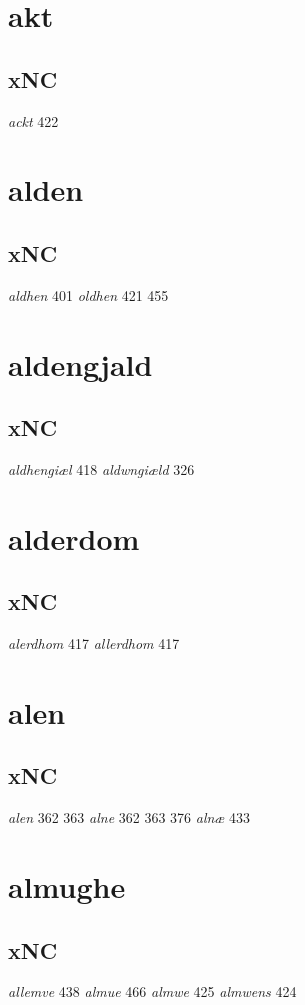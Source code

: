 \documentclass[a4paper,twocolumn]{article}
\begin{document}
\section{akt}
\label{sec:orga728b2c}
\subsection{xNC}
\label{sec:orgcb6cc9c}
\emph{ackt} 422 
\section{alden}
\label{sec:org356114f}
\subsection{xNC}
\label{sec:org428e76a}
\emph{aldhen} 401 \emph{oldhen} 421 455 
\section{aldengjald}
\label{sec:org0dddda7}
\subsection{xNC}
\label{sec:org22f278d}
\emph{aldhengiæl} 418 \emph{aldwngiæld} 326 
\section{alderdom}
\label{sec:orgf5b20a6}
\subsection{xNC}
\label{sec:orgbaeb175}
\emph{alerdhom} 417 \emph{allerdhom} 417 
\section{alen}
\label{sec:orgd7176ea}
\subsection{xNC}
\label{sec:orgc57f4dc}
\emph{alen} 362 363 \emph{alne} 362 363 376 \emph{alnæ} 433 
\section{almughe}
\label{sec:orgf19d8f9}
\subsection{xNC}
\label{sec:org6e77393}
\emph{allemve} 438 \emph{almue} 466 \emph{almwe} 425 \emph{almwens} 424 
\end{document}
